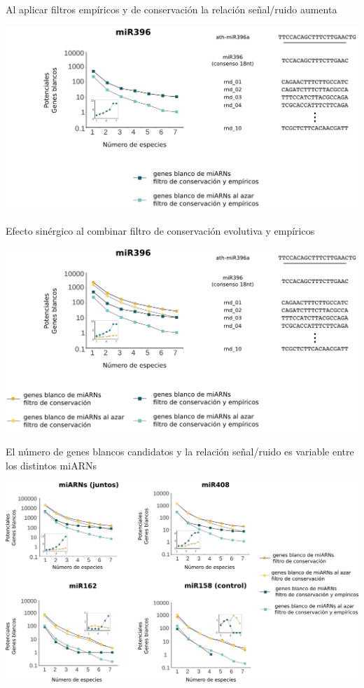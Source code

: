 \documentclass{beamer}
\begin{document}
\begin{frame}{Al aplicar filtros empíricos y de conservación la relación señal/ruido aumenta}
	\begin{center}
		\includegraphics[width=1\textwidth]{img/NAR_fig2_04.png}
	\end{center}
\end{frame}

\begin{frame}{Efecto sinérgico al combinar filtro de conservación evolutiva y empíricos}
	\begin{center}
		\includegraphics[width=1\textwidth]{img/NAR_fig2_05.png}
	\end{center}
\end{frame}

\begin{frame}{El número de genes blancos candidatos y la relación señal/ruido es variable entre los distintos miARNs}
	\begin{center}
		\includegraphics[width=1\textwidth]{img/NAR_fig2_bis.png}
	\end{center}
\end{frame}
\end{document}
